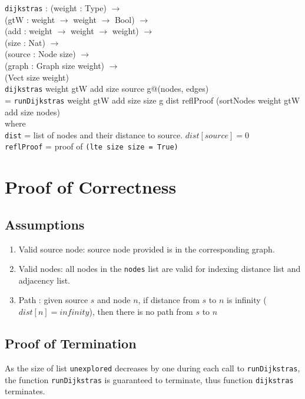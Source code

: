 \documentclass[11pt, oneside]{article}   	%
\newcommand\tab[1][1cm]{\hspace*{#1}}
\begin{document}
\texttt{dijkstras} :  (weight : Type) $\rightarrow$ \\
                \tab\tab (gtW : weight $\rightarrow$ weight $\rightarrow$ Bool) $\rightarrow$ \\
            	\tab\tab(add : weight $\rightarrow$ weight $\rightarrow$ weight) $\rightarrow$ \\
            	\tab\tab(size : Nat) $\rightarrow$ \\
            	\tab\tab(source : Node size) $\rightarrow$ \\
            	\tab\tab(graph : Graph size weight) $\rightarrow$ \\
            	\tab\tab(Vect size weight)\\
\texttt{dijkstras} weight gtW add size source g@(nodes, edges) \\
\tab  = \texttt{runDijkstras} weight gtW add size size g dist reflProof (sortNodes weight gtW add size nodes) \\
\tab\tab where \\
\tab\tab\tab \texttt{dist} = list of nodes and their distance to source. $dist[source] = 0$\\
\tab\tab\tab \texttt{reflProof} = proof of \texttt{(lte size size = True)}

\section{Proof of Correctness} 

\subsection{Assumptions}
\begin{enumerate}
  \item Valid source node: source node provided is in the corresponding graph. 
  \item Valid nodes: all nodes in the \texttt{nodes} list are valid for indexing distance list and adjacency list. 
  \item Path : given source $s$ and node $n$, if distance from $s$ to $n$ is infinity ($dist[n] = infinity$), then there is no path from $s$ to $n$
\end{enumerate}

\subsection{Proof of Termination}
As the size of list \texttt{unexplored} decreases by one during each call to \texttt{runDijkstras}, the function \texttt{runDijkstras} is guaranteed to terminate, thus function \texttt{dijkstras} terminates. 
\end{document}
